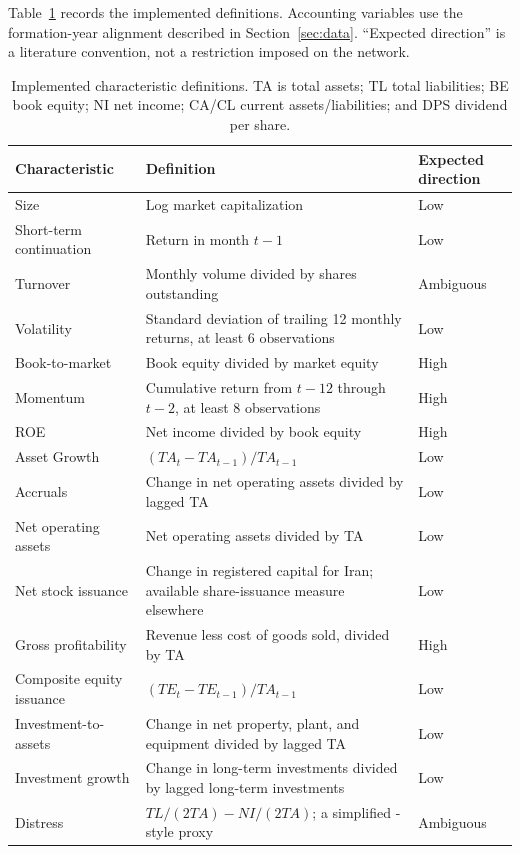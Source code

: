 \documentclass[12pt]{article}
\begin{document}
Table~\ref{tab:char_defs} records the implemented definitions. Accounting variables use the formation-year alignment described in Section~\ref{sec:data}. ``Expected direction'' is a literature convention, not a restriction imposed on the network.

\begin{table}[htbp]
\centering
\caption{Implemented characteristic definitions. TA is total assets; TL total liabilities; BE book equity; NI net income; CA/CL current assets/liabilities; and DPS dividend per share.}
\label{tab:char_defs}
\scriptsize
\begin{tabular}{@{}>{\raggedright\arraybackslash}p{3.4cm}>{\raggedright\arraybackslash}p{8.2cm}>{\raggedright\arraybackslash}p{2.1cm}@{}}
\toprule
Characteristic & Definition & Expected direction \\
\midrule
Size & Log market capitalization & Low \\
Short-term continuation & Return in month $t-1$ & Low \\
Turnover & Monthly volume divided by shares outstanding & Ambiguous \\
Volatility & Standard deviation of trailing 12 monthly returns, at least 6 observations & Low \\
Book-to-market & Book equity divided by market equity & High \\
Momentum & Cumulative return from $t-12$ through $t-2$, at least 8 observations & High \\
ROE & Net income divided by book equity & High \\
Asset Growth & $(TA_t-TA_{t-1})/TA_{t-1}$ & Low \\
Accruals & Change in net operating assets divided by lagged TA & Low \\
Net operating assets & Net operating assets divided by TA & Low \\
Net stock issuance & Change in registered capital for Iran; available share-issuance measure elsewhere & Low \\
Gross profitability & Revenue less cost of goods sold, divided by TA & High \\
Composite equity issuance & $(TE_t-TE_{t-1})/TA_{t-1}$ & Low \\
Investment-to-assets & Change in net property, plant, and equipment divided by lagged TA & Low \\
Investment growth & Change in long-term investments divided by lagged long-term investments & Low \\
Distress & $TL/(2TA)-NI/(2TA)$; a simplified \citet{campbell2008}-style proxy & Ambiguous \\

\end{tabular}
\end{table}
\end{document}
